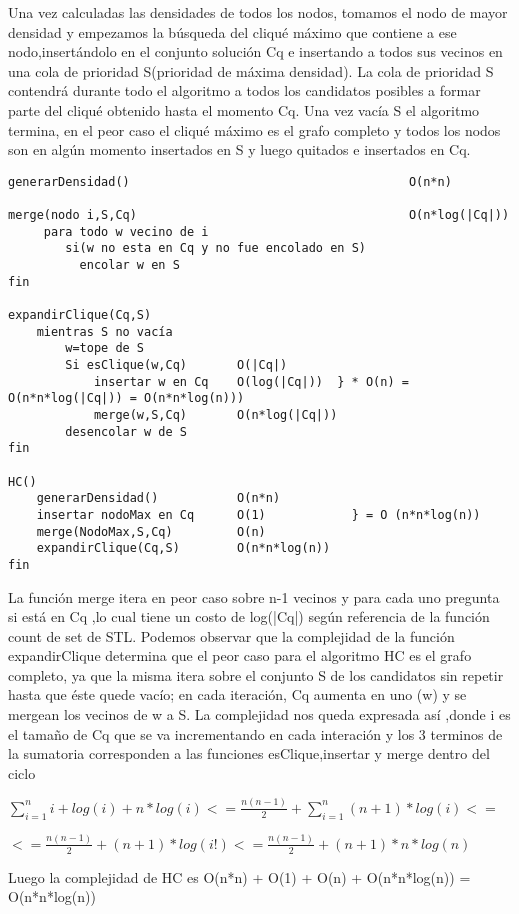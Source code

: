 Una vez calculadas las densidades de todos los nodos, tomamos el nodo de mayor densidad y empezamos la búsqueda del cliqué máximo que contiene a ese nodo,insertándolo en el conjunto solución Cq e insertando a todos sus vecinos en una cola de prioridad S(prioridad de máxima densidad).
La cola de prioridad S contendrá durante todo el algoritmo a todos los candidatos posibles a formar parte del cliqué obtenido hasta el momento Cq.
Una vez vacía S el algoritmo termina, en el peor caso el cliqué máximo es el grafo completo y todos los nodos son en algún momento insertados en S y luego quitados e insertados en Cq.

\begin{verbatim}
generarDensidad()										O(n*n)
	
merge(nodo i,S,Cq)										O(n*log(|Cq|))	        
     para todo w vecino de i 
        si(w no esta en Cq y no fue encolado en S)
          encolar w en S
fin

expandirClique(Cq,S)								
    mientras S no vacía					 			
        w=tope de S									
        Si esClique(w,Cq)       O(|Cq|)				
            insertar w en Cq    O(log(|Cq|))  } * O(n) = O(n*n*log(|Cq|)) = O(n*n*log(n)))
            merge(w,S,Cq)       O(n*log(|Cq|))		
        desencolar w de S		              
fin												
									
HC()										 	
    generarDensidad()           O(n*n)		   	
    insertar nodoMax en Cq      O(1)            } = O (n*n*log(n)) 	
    merge(NodoMax,S,Cq)         O(n)			   
    expandirClique(Cq,S)        O(n*n*log(n))	 	
fin												

\end{verbatim}
La función merge itera en peor caso sobre n-1 vecinos y para cada uno pregunta si está en Cq ,lo cual tiene un costo de log(|Cq|) según referencia de la función count de set de STL. 
Podemos observar que la complejidad de la función expandirClique determina que el peor caso para el algoritmo HC es el grafo completo, ya que la misma itera sobre el conjunto S de los candidatos sin repetir hasta que éste quede vacío; en cada iteración, Cq aumenta en uno (w) y se mergean los vecinos de w a S.
La complejidad nos queda expresada así ,donde i es el tamaño de Cq que se va incrementando en cada interación y los 3 terminos de la sumatoria corresponden a las funciones esClique,insertar y merge dentro del ciclo

$\displaystyle \sum_{i=1}^{n} i + log(i) + n*log(i) <= \frac{n(n-1)}{2}+\sum_{i=1}^{n} (n+1)*log(i) <=$  
 
$\displaystyle  <= \frac{n(n-1)}{2}+(n+1)*log(i!) <= \frac{n(n-1)}{2}+(n+1)*n*log(n) $

Luego la complejidad de HC es O(n*n) + O(1) + O(n) + O(n*n*log(n)) = O(n*n*log(n))  

